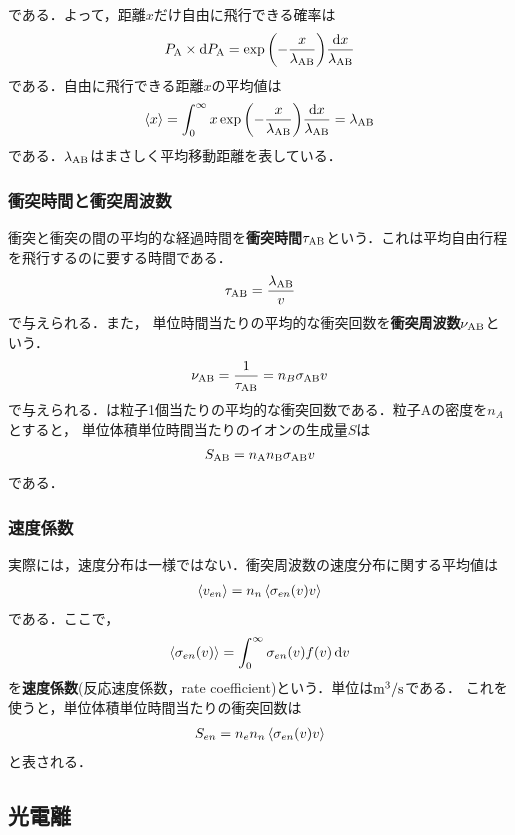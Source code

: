 \documentclass{report}
\begin{document}
        である．よって，距離$x$だけ自由に飛行できる確率は
        \begin{align}
          P_{\mathrm{A}}\times\dd{P_{\mathrm{A}}} = \exp\qty(-\frac{x}{\lambda_{\mathrm{AB}}})\frac{\dd{x}}{\lambda_{\mathrm{AB}}}
        \end{align}
        である．自由に飛行できる距離$x$の平均値は
        \begin{align}
          \ev{x} = \int_0^{\infty} x\exp\qty(-\frac{x}{\lambda_{\r{AB}}})\frac{\dd{x}}{\lambda_{\r{AB}}} = \lambda_{\r{AB}}
        \end{align}
        である．$\lambda_{\mathrm{AB}}$はまさしく平均移動距離を表している．
      \subsubsection{衝突時間と衝突周波数}
        衝突と衝突の間の平均的な経過時間を\textbf{衝突時間}$\tau_{\mathrm{AB}}$という．これは平均自由行程を飛行するのに要する時間である．
        \begin{align}
          \tau_{\mathrm{AB}} = \frac{\lambda_{\mathrm{AB}}}{v} \label{eq:collision_time}
        \end{align}
        で与えられる．また，
        単位時間当たりの平均的な衝突回数を\textbf{衝突周波数}$\nu_{\mathrm{AB}}$という．
        \begin{align}
          \nu_{\mathrm{AB}} = \frac{1}{\tau_{\mathrm{AB}}} = n_B \sigma_{\mathrm{AB}} v \label{eq:collision_frequency}
        \end{align}
        で与えられる．は粒子1個当たりの平均的な衝突回数である．粒子Aの密度を$n_A$とすると，
        単位体積単位時間当たりのイオンの生成量$S$は
        \begin{align}
          S_{\mathrm{AB}} = n_{\mathrm{A}} n_{\mathrm{B}} \sigma_{\mathrm{AB}} v
        \end{align}
        である．
      \subsubsection{速度係数}
        実際には，速度分布は一様ではない．衝突周波数の速度分布に関する平均値は
        \begin{align}
          \ev{v_{en}} = n_n \ev{\sigma_{en}(v)v}
        \end{align}
        である．ここで，
        \begin{align}
          \ev{\sigma_{en}(v)} = \int_0^{\infty} \sigma_{en}(v)f(v)\dd{v}
        \end{align}
        を\textbf{速度係数}(反応速度係数，rate coefficient)という．単位は$\mathrm{m^3/s}$である．
        これを使うと，単位体積単位時間当たりの衝突回数は
        \begin{align}
          S_{en} = n_e n_n \ev{\sigma_{en}(v)v}
        \end{align}
        と表される．
    \subsection{光電離}
\end{document}
